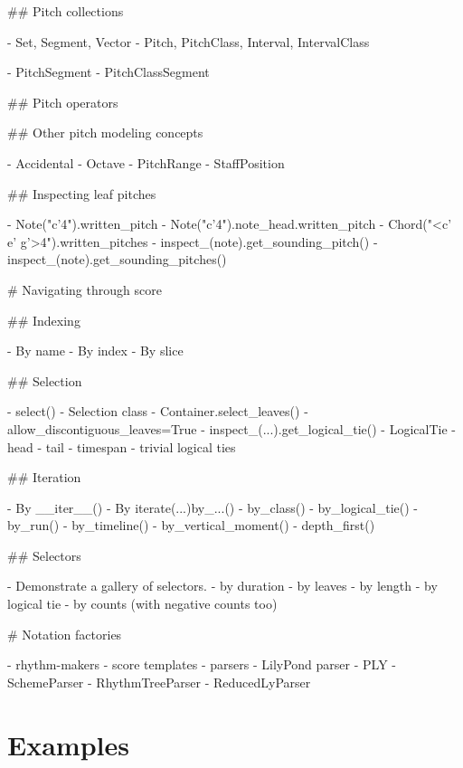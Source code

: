 \begin{markdown}
## Pitch collections

-   Set, Segment, Vector
-   Pitch, PitchClass, Interval, IntervalClass

-   PitchSegment
-   PitchClassSegment

## Pitch operators

## Other pitch modeling concepts

-   Accidental
-   Octave
-   PitchRange
-   StaffPosition

## Inspecting leaf pitches

-   Note("c'4").written_pitch
-   Note("c'4").note_head.written_pitch
-   Chord("<c' e' g'>4").written_pitches
-   inspect_(note).get_sounding_pitch()
-   inspect_(note).get_sounding_pitches()

# Navigating through score

## Indexing

-   By name
-   By index
-   By slice

## Selection

-   select()
-   Selection class
-   Container.select_leaves()
    -   allow_discontiguous_leaves=True
-   inspect_(...).get_logical_tie()
-   LogicalTie
    -   head
    -   tail
    -   timespan
    -   trivial logical ties

## Iteration

-   By __iter__()
-   By iterate(...)by_...()
    -   by_class()
    -   by_logical_tie()
    -   by_run()
    -   by_timeline()
    -   by_vertical_moment()
    -   depth_first()

## Selectors

-   Demonstrate a gallery of selectors.
    -   by duration
    -   by leaves
    -   by length
    -   by logical tie
    -   by counts (with negative counts too)

# Notation factories

-   rhythm-makers
-   score templates
-   parsers
    -   LilyPond parser
    -   PLY
    -   SchemeParser
    -   RhythmTreeParser
    -   ReducedLyParser

\end{markdown}

\section{Examples}

\begin{comment}
<abjad>
upper_voice = Voice(name='Upper Voice')
upper_staff = Staff([upper_voice], name='Upper Staff')
lower_voice_a = Voice(name='Lower Voice A')
lower_voice_b = Voice(name='Lower Voice B')
lower_staff = Staff([lower_voice_a, lower_voice_b], name='Lower Staff')
piano_staff = StaffGroup([upper_staff, lower_staff], context_name='PianoStaff')
</abjad>
\end{comment}

